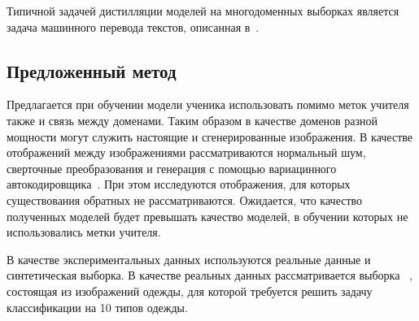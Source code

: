 Типичной задачей дистилляции моделей на многодоменных выборках является задача машинного перевода текстов, описанная в~\cite{KimRush2016}.

\subsection{Предложенный метод}

Предлагается при обучении модели ученика использовать помимо меток учителя также и связь между доменами. Таким образом в качестве доменов разной мощности могут служить настоящие и сгенерированные изображения. В качестве отображений между изображениями рассматриваются нормальный шум, сверточные преобразования и генерация с помощью вариацинного автокодировщика~\cite{VAE}. При этом исследуются отображения, для которых существования обратных не рассматриваются. Ожидается, что качество полученных моделей будет превышать качество моделей, в обучении которых не использовались метки учителя.

В качестве экспериментальных данных используются реальные данные и синтетическая выборка. В качестве реальных данных рассматривается выборка ~\cite{FMNIST}, состоящая из изображений одежды, для которой требуется решить задачу классификации на 10 типов одежды.\\

